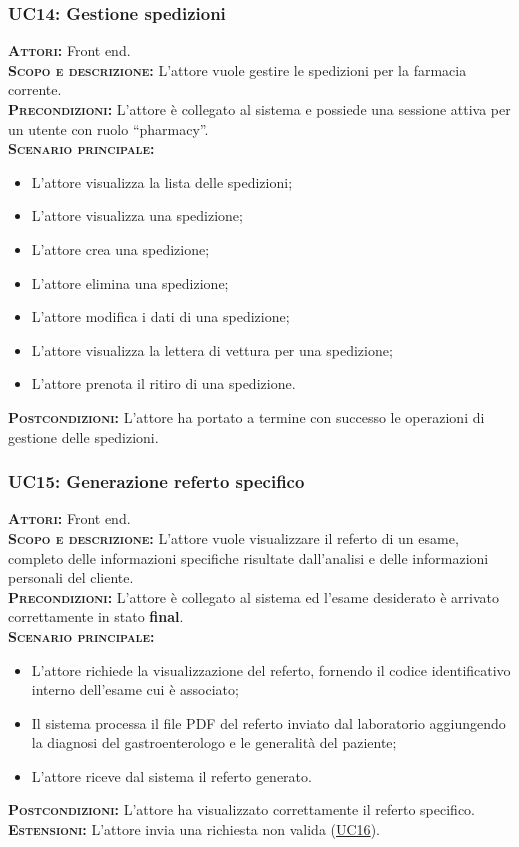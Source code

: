 \subsubsection{UC14: Gestione spedizioni}
\label{sec:UC14}
\textsc{\textbf{Attori:}} Front end.\\
\textsc{\textbf{Scopo e descrizione:}} L'attore vuole gestire le spedizioni per la farmacia corrente.\\
\textsc{\textsc{\textbf{Precondizioni:}}} L'attore è collegato al sistema e possiede una sessione attiva per un utente con ruolo ``pharmacy''.\\
\textsc{\textbf{Scenario principale:}}
\begin{itemize}
    \item L'attore visualizza la lista delle spedizioni;
    \item L'attore visualizza una spedizione;
    \item L'attore crea una spedizione;
    \item L'attore elimina una spedizione;
    \item L'attore modifica i dati di una spedizione;
    \item L'attore visualizza la lettera di vettura per una spedizione;
    \item L'attore prenota il ritiro di una spedizione.
\end{itemize}
\textsc{\textbf{Postcondizioni:}} L'attore ha portato a termine con successo le operazioni di gestione delle spedizioni.

\subsubsection{UC15: Generazione referto specifico}
\label{sec:UC15}
\textsc{\textbf{Attori:}} Front end.\\
\textsc{\textbf{Scopo e descrizione:}} L'attore vuole visualizzare il referto di un esame, completo delle informazioni specifiche risultate dall'analisi e delle informazioni personali del cliente.\\
\textsc{\textsc{\textbf{Precondizioni:}}} L'attore è collegato al sistema ed l'esame desiderato è arrivato correttamente in stato \textbf{final}.\\
\textsc{\textbf{Scenario principale:}}
\begin{itemize}
    \item L'attore richiede la visualizzazione del referto, fornendo il codice identificativo interno dell'esame cui è associato;
    \item Il sistema processa il file PDF del referto inviato dal laboratorio aggiungendo la diagnosi del gastroenterologo e le generalità del paziente;
    \item L'attore riceve dal sistema il referto generato.
\end{itemize}
\textsc{\textbf{Postcondizioni:}} L'attore ha visualizzato correttamente il referto specifico.\\
\textsc{\textbf{Estensioni:}} L'attore invia una richiesta non valida (\hyperref[sec:UC16]{UC16}).

